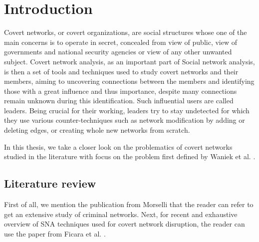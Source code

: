\chapter*{Introduction}

\setcounter{page}{1}

Covert networks, or covert organizations, are social structures whose one of the main concerns is to operate in secret,
concealed from view of public, view of governments and national security agencies or view of any other unwanted subject.
Covert network analysis, as an important part of Social network analysis, is then a set of tools and techniques used to study
covert networks and their members, aiming to uncovering connections between the members and identifying those with a great
influence and thus importance, despite many connections remain unknown during this identification.
Such influential users are called leaders.
Being crucial for their working, leaders try to stay undetected for which they use various counter-techniques such as
network modification by adding or deleting edges, or creating whole new networks from scratch.

In this thesis, we take a closer look on the problematics of covert networks studied in the literature
with focus on the \HL problem first defined by Waniek et al. \cite{Waniek2017}.


\section{Literature review}

First of all, we mention the publication from Morselli \cite{Morselli2009} that the reader can refer to get
an extensive study of criminal networks.
Next, for recent and exhaustive overview of SNA techniques used for covert network disruption,
the reader can use the paper from Ficara et al. \cite{Ficara2022}.


